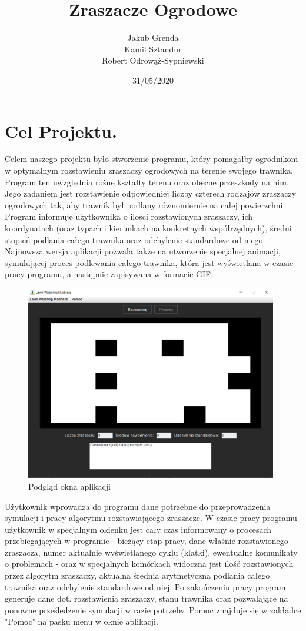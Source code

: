 \documentclass[a4paper]{article}
\title{\textbf{Zraszacze Ogrodowe}}
\author{Jakub Grenda\\ Kamil Sztandur\\ Robert Odrowąż-Sypniewski}
\date{31/05/2020}
\begin{document}
\maketitle

\section{Cel Projektu.}
Celem naszego projektu było stworzenie programu, który pomagałby ogrodnikom w optymalnym rozstawieniu zraszaczy ogrodowych na terenie swojego trawnika. Program ten uwzględnia różne kształty terenu oraz obecne przeszkody na nim. Jego zadaniem jest rozstawienie odpowiedniej liczby czterech rodzajów zraszaczy ogrodowych tak, aby trawnik był podlany równomiernie na całej powierzchni. Program informuje użytkownika o ilości rozstawionych zraszaczy, ich koordynatach (oraz typach i kierunkach na konkretnych współrzędnych), średni stopień podlania całego trawnika oraz odchylenie standardowe od niego. \newline Najnowsza wersja aplikacji pozwala także na utworzenie specjalnej animacji, symulującej proces podlewania całego trawnika, która jest wyświetlana w czasie pracy programu, a następnie zapisywana w formacie GIF.
\newline

\begin{figure}[H]
    \includegraphics[width=11cm]{Podgląd.png}
    \centering
    \caption{Podgląd okna aplikacji}
\end{figure}

Użytkownik wprowadza do programu dane potrzebne do przeprowadzenia symulacji i pracy algorytmu rozstawiającego zraszacze. W czasie pracy programu użytkownik w specjalnym okienku jest cały czas informowany o procesach przebiegających w programie - bieżący etap pracy, dane właśnie rozstawionego zraszacza, numer aktualnie wyświetlanego cyklu (klatki), ewentualne komunikaty o problemach - oraz w specjalnych komórkach widoczna jest ilość rozstawionych przez algorytm zraszaczy, aktualna średnia arytmetyczna podlania całego trawnika oraz odchylenie standardowe od niej. Po zakończeniu pracy program generuje dane dot. rozstawienia zraszaczy, stanu trawnika oraz pozwalające na ponowne prześledzenie symulacji w razie potrzeby. Pomoc znajduje się w zakładce "Pomoc" na pasku menu w oknie aplikacji.
\end{document}

